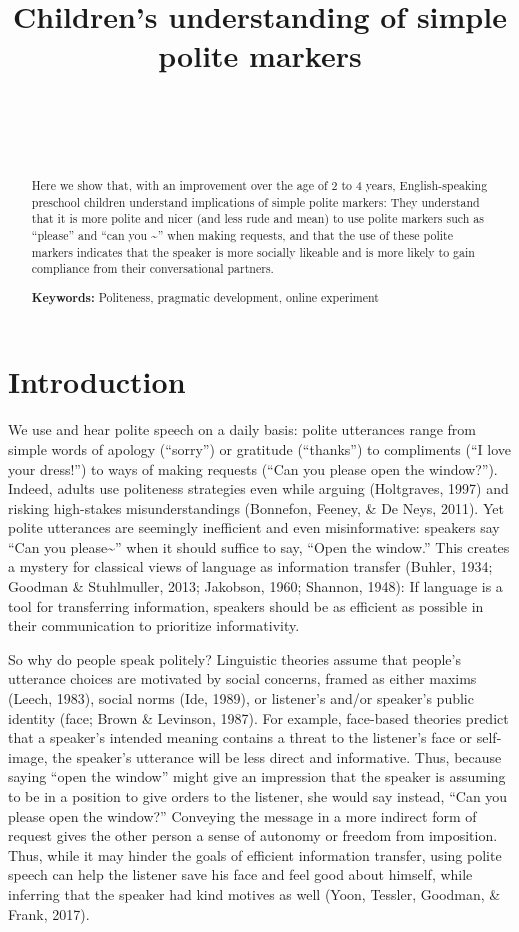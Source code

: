 \documentclass[10pt, letterpaper]{article}
\title{Children's understanding of simple polite markers}
\author{{\large \bf } \\ \texttt{} \\  \\}
\begin{document}
\maketitle

\begin{abstract}
Here we show that, with an improvement over the age of 2 to 4 years,
English-speaking preschool children understand implications of simple
polite markers: They understand that it is more polite and nicer (and
less rude and mean) to use polite markers such as ``please'' and ``can
you \textasciitilde{}'' when making requests, and that the use of these
polite markers indicates that the speaker is more socially likeable and
is more likely to gain compliance from their conversational partners.

\textbf{Keywords:}
Politeness, pragmatic development, online experiment
\end{abstract}

\section{Introduction}\label{introduction}

We use and hear polite speech on a daily basis: polite utterances range
from simple words of apology (``sorry'') or gratitude (``thanks'') to
compliments (``I love your dress!'') to ways of making requests (``Can
you please open the window?''). Indeed, adults use politeness strategies
even while arguing (Holtgraves, 1997) and risking high-stakes
misunderstandings (Bonnefon, Feeney, \& De Neys, 2011). Yet polite
utterances are seemingly inefficient and even misinformative: speakers
say ``Can you please\textasciitilde{}'' when it should suffice to say,
``Open the window.'' This creates a mystery for classical views of
language as information transfer (Buhler, 1934; Goodman \& Stuhlmuller,
2013; Jakobson, 1960; Shannon, 1948): If language is a tool for
transferring information, speakers should be as efficient as possible in
their communication to prioritize informativity.

So why do people speak politely? Linguistic theories assume that
people's utterance choices are motivated by social concerns, framed as
either maxims (Leech, 1983), social norms (Ide, 1989), or listener's
and/or speaker's public identity (face; Brown \& Levinson, 1987). For
example, face-based theories predict that a speaker's intended meaning
contains a threat to the listener's face or self-image, the speaker's
utterance will be less direct and informative. Thus, because saying
``open the window'' might give an impression that the speaker is
assuming to be in a position to give orders to the listener, she would
say instead, ``Can you please open the window?'' Conveying the message
in a more indirect form of request gives the other person a sense of
autonomy or freedom from imposition. Thus, while it may hinder the goals
of efficient information transfer, using polite speech can help the
listener save his face and feel good about himself, while inferring that
the speaker had kind motives as well (Yoon, Tessler, Goodman, \& Frank,
2017).
\end{document}
